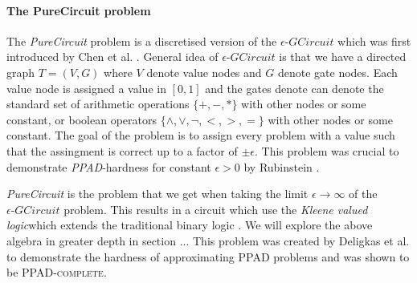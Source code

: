 \paragraph{The PureCircuit problem}
\label{par:pure-circ-def}
The \textit{PureCircuit} problem is a discretised version of the $\epsilon\textit{-GCircuit}$
which was first introduced by Chen et al. \cite{deligkas_PureCircuitTightInapproximability_2024,chen_SettlingComplexityComputing_2009}.
General idea of $\epsilon\textit{-GCircuit}$ is that we have a directed graph  $T= (V,G)$ where
$V$ denote value nodes and $G$ denote gate nodes. Each value node is assigned a value in $[0,1]$
and the gates denote can denote the standard set of arithmetic operations $\{+, - ,*\}$ with other
nodes or some constant, or boolean operators $\{\wedge, \vee, \neg, <, >, =\}$ with other nodes or some constant.
The goal of the problem is to assign every problem with a value such that the assingment is correct up to a
factor of $\pm \epsilon$. This problem was crucial to demonstrate \textit{PPAD}-hardness for constant $\epsilon > 0$
by Rubinstein \cite{deligkas_PureCircuitTightInapproximability_2024,rubinstein_InapproximabilityNashEquilibrium_2015}.



\textit{PureCircuit} is the problem that we get when taking the limit $\epsilon \to \infty$ of the $\epsilon\textit{-GCircuit}$ problem.
This results in a circuit which
use the \textit{Kleene valued logic}which extends the traditional binary logic \cite{kleene_IntroductionMetamathematics_2009}.
We will explore the above algebra in greater depth in section {..}. %
This problem was created by Deligkas et al. \cite{deligkas_PureCircuitTightInapproximability_2024}
to demonstrate the hardness of approximating \textsc{PPAD} problems and was shown to be \textsc{PPAD-complete}.

